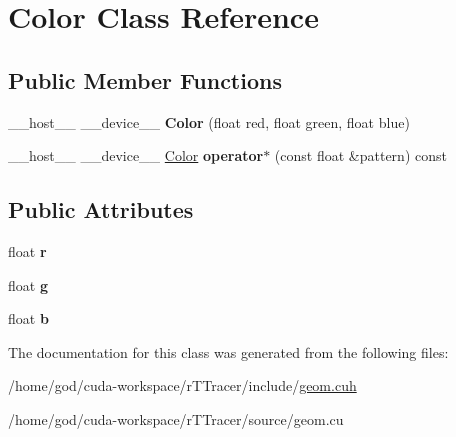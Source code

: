 \hypertarget{class_color}{}\section{Color Class Reference}
\label{class_color}
\subsection*{Public Member Functions}
\begin{DoxyCompactItemize}
\item 
\+\_\+\+\_\+host\+\_\+\+\_\+ \+\_\+\+\_\+device\+\_\+\+\_\+ {\bfseries Color} (float red, float green, float blue)\hypertarget{class_color_a6a7cb8dac1635db291832221f50e6342}{}\label{class_color_a6a7cb8dac1635db291832221f50e6342}

\item 
\+\_\+\+\_\+host\+\_\+\+\_\+ \+\_\+\+\_\+device\+\_\+\+\_\+ \hyperlink{class_color}{Color} {\bfseries operator$\ast$} (const float \&pattern) const\hypertarget{class_color_a81ac566b8402177923ba530c7eefd8da}{}\label{class_color_a81ac566b8402177923ba530c7eefd8da}

\end{DoxyCompactItemize}
\subsection*{Public Attributes}
\begin{DoxyCompactItemize}
\item 
float {\bfseries r}\hypertarget{class_color_a3958a556b47d2de3dd45c75aac833c20}{}\label{class_color_a3958a556b47d2de3dd45c75aac833c20}

\item 
float {\bfseries g}\hypertarget{class_color_a5defbb21620e480e556181772d665f34}{}\label{class_color_a5defbb21620e480e556181772d665f34}

\item 
float {\bfseries b}\hypertarget{class_color_a33e482be18d6ea31d2b403bee13683b7}{}\label{class_color_a33e482be18d6ea31d2b403bee13683b7}

\end{DoxyCompactItemize}


The documentation for this class was generated from the following files\+:\begin{DoxyCompactItemize}
\item 
/home/god/cuda-\/workspace/r\+T\+Tracer/include/\hyperlink{geom_8cuh}{geom.\+cuh}\item 
/home/god/cuda-\/workspace/r\+T\+Tracer/source/geom.\+cu\end{DoxyCompactItemize}
